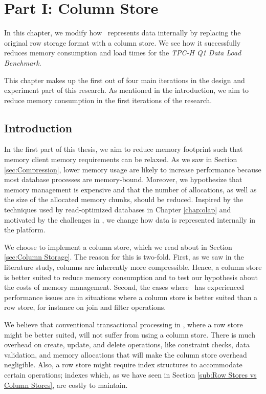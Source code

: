 \chapter{Part I: Column Store}
\label{chap:column-store}

In this chapter, we modify how \gap~represents data internally by replacing the original row storage format with a column store. We see how it successfully reduces memory consumption and load times for the \textit{TPC-H Q1 Data Load Benchmark}.

This chapter makes up the first out of four main iterations in the design and experiment part of this research. As mentioned in the introduction, we aim to reduce memory consumption in the first iterations of the research.

\clearpage

\section{Introduction}
\label{sec:Introduction}
In the first part of this thesis, we aim to reduce memory footprint such that memory client memory requirements can be relaxed. As we saw in Section \ref{sec:Compression}, lower memory usage are likely to increase performance because most database processes are memory-bound. Moreover, we hypothesize that memory management is expensive and that the number of allocations, as well as the size of the allocated memory chunks, should be reduced. Inspired by the techniques used by read-optimized databases in Chapter \ref{chap:olap} and motivated by the challenges in \gap, we change how data is represented internally in the platform.

We choose to implement a column store, which we read about in Section \ref{sec:Column Storage}. The reason for this is two-fold. First, as we saw in the literature study, columns are inherently more compressible. Hence, a column store is better suited to reduce memory consumption and to test our hypothesis about the costs of memory management. Second, the cases where \genus~has experienced performance issues are in situations where a column store is better suited than a row store, for instance on join and filter operations.

We believe that conventional transactional processing in \gap, where a row store might be better suited, will not suffer from using a column store. There is much overhead on create, update, and delete operations, like constraint checks, data validation, and memory allocations that will make the column store overhead negligible. Also, a row store might require index structures to accommodate certain operations; indexes which, as we have seen in Section \ref{sub:Row Stores vs Column Stores}, are costly to maintain.

